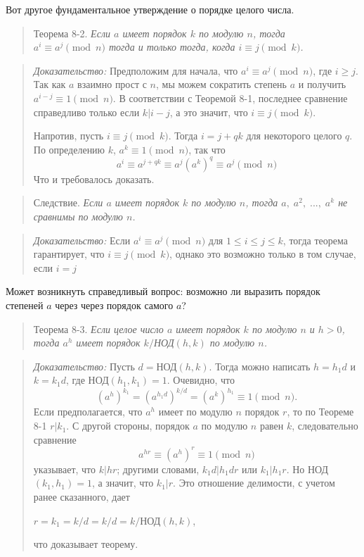\documentclass[11pt]{article}
\begin{document}
Вот другое фундаментальное утверждение о порядке целого числа.
\begin{quote}
	\large{Теорема 8-2}. \it Если $a$ имеет порядок $k$ по модулю $n$, тогда $a^i\equiv a^j\pmod{n}$ тогда и только тогда, когда $i\equiv j\pmod{k}$.
\end{quote}
\begin{quote}
	\emph{Доказательство:} Предположим для начала, что $a^i\equiv a^j\pmod{n}$, где $i\geq{j}$. Так как $a$ взаимно прост с $n$, мы можем сократить степень $a$ и получить $a^{i-j}\equiv1\pmod{n}$. В соответствии с Теоремой 8-1, последнее сравнение справедливо только если $k|i-j$, а это значит, что $i\equiv j\pmod{k}$.
	
	Напротив, пусть $i\equiv j\pmod{k}$. Тогда $i=j+qk$ для некоторого целого $q$. По определению $k$, $a^k\equiv1\pmod{n}$, так что $$a^i\equiv a^{j+qk}\equiv a^j(a^k)^q \equiv a^j\pmod{n}$$
	Что и требовалось доказать.
\end{quote}
\begin{quote}
	\large{Следствие}. \it Если $a$ имеет порядок $k$ по модулю $n$, тогда $a,\;a^2,\;...,\;a^k$ не сравнимы по модулю $n$.
\end{quote}
\begin{quote}
	\emph{Доказательство:} Если $a^i\equiv a^j\pmod{n}$ для $1\leq i\leq j\leq k$, тогда теорема гарантирует, что $i\equiv j\pmod{k}$, однако это возможно только в том случае, если $i=j$
\end{quote}

Может возникнуть справедливый вопрос: возможно ли выразить порядок степеней $a$ через через порядок самого $a$?
\begin{quote}
	\large{Теорема 8-3}. \it Если целое число $a$ имеет порядок $k$ по модулю $n$ и $h>0$, тогда $a^h$ имеет порядок $k/$НОД$(h,k)$ по модулю $n$.
\end{quote}
\begin{quote}
    \emph{Доказательство:} Пусть $d=$НОД$(h,k)$. Тогда можно написать $h=h_1d$ и $k=k_1d$, где НОД$(h_1,k_1)=1$. Очевидно, что $$(a^h)^{k_1}=(a^{h_1d})^{k/d}=(a^k)^{h_1}\equiv1\pmod{n}.$$
    Если предполагается, что $a^h$ имеет по модулю $n$ порядок $r$, то по Теореме 8-1 $r|k_1$. С другой стороны, порядок $a$ по модулю $n$ равен $k$, следовательно сравнение $$a^{hr}\equiv(a^h)^r\equiv1\pmod{n}$$ указывает, что $k|hr$; другими словами, $k_1d|h_1dr$ или $k_1|h_1r$. Но НОД$(k_1,h_1)=1$, а значит, что $k_1|r$. Это отношение делимости, с учетом ранее сказанного, дает
    \begin{center}
    $r=k_1=k/d=k/d=k/$НОД$(h,k)$,
    \end{center}
    что доказывает теорему.
\end{quote}
\end{document}
